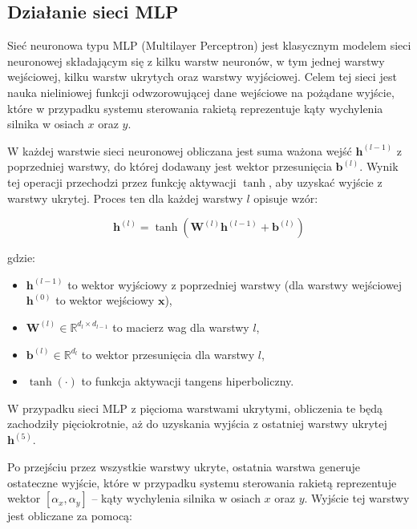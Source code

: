 \subsection{Działanie sieci MLP}

Sieć neuronowa typu MLP (Multilayer Perceptron) jest klasycznym modelem sieci neuronowej składającym się z kilku warstw neuronów, w tym jednej warstwy wejściowej, kilku warstw ukrytych oraz warstwy wyjściowej. Celem tej sieci jest nauka nieliniowej funkcji odwzorowującej dane wejściowe na pożądane wyjście, które w przypadku systemu sterowania rakietą reprezentuje kąty wychylenia silnika w osiach \(x\) oraz \(y\).

W każdej warstwie sieci neuronowej obliczana jest suma ważona wejść \( \mathbf{h}^{(l-1)} \) z poprzedniej warstwy, do której dodawany jest wektor przesunięcia \( \mathbf{b}^{(l)} \). Wynik tej operacji przechodzi przez funkcję aktywacji \( \tanh \), aby uzyskać wyjście z warstwy ukrytej. Proces ten dla każdej warstwy \( l \) opisuje wzór:

\begin{equation}
\mathbf{h}^{(l)} = \tanh\left( \mathbf{W}^{(l)} \mathbf{h}^{(l-1)} + \mathbf{b}^{(l)} \right)
\end{equation}

gdzie:
\begin{itemize}
  \item \( \mathbf{h}^{(l-1)} \) to wektor wyjściowy z poprzedniej warstwy (dla warstwy wejściowej \( \mathbf{h}^{(0)} \) to wektor wejściowy \( \mathbf{x} \)),
  \item \( \mathbf{W}^{(l)} \in \mathbb{R}^{d_l \times d_{l-1}} \) to macierz wag dla warstwy \( l \),
  \item \( \mathbf{b}^{(l)} \in \mathbb{R}^{d_l} \) to wektor przesunięcia dla warstwy \( l \),
  \item \( \tanh(\cdot) \) to funkcja aktywacji tangens hiperboliczny.
\end{itemize}

W przypadku sieci MLP z pięcioma warstwami ukrytymi, obliczenia te będą zachodziły pięciokrotnie, aż do uzyskania wyjścia z ostatniej warstwy ukrytej \( \mathbf{h}^{(5)} \).

Po przejściu przez wszystkie warstwy ukryte, ostatnia warstwa generuje ostateczne wyjście, które w przypadku systemu sterowania rakietą reprezentuje wektor \([\alpha_x, \alpha_y]\) – kąty wychylenia silnika w osiach \(x\) oraz \(y\). Wyjście tej warstwy jest obliczane za pomocą:

